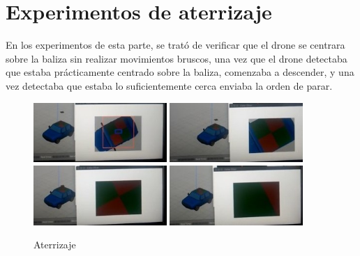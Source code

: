 \section{Experimentos de aterrizaje}

\hspace{1cm} En los experimentos de esta parte, se trat\'o de verificar que el drone se centrara sobre la baliza sin realizar movimientos bruscos, una vez que el drone detectaba que estaba pr\'acticamente centrado sobre la baliza, comenzaba a descender, y una vez detectaba que estaba lo suficientemente cerca enviaba la orden de parar.%

\begin{figure}[H]
 \centering
    \includegraphics[width=0.45\textwidth]{imgs/landing1_1.jpg}
    \includegraphics[width=0.45\textwidth]{imgs/landing2_1.jpg}
    \includegraphics[width=0.45\textwidth]{imgs/landing3_1.jpg}
    \includegraphics[width=0.45\textwidth]{imgs/landing4_1.jpg}
 \caption{Aterrizaje}
 \label{f:Aterrizaje sobre el simulador}
\end{figure}


